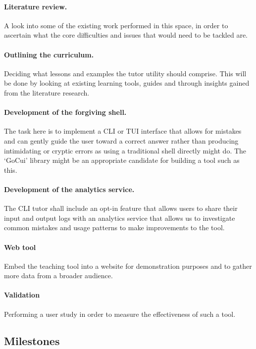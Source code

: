 \documentclass{task_description}
\begin{document}
\paragraph{Literature review.} A look into some of the existing work performed in
this space, in order to ascertain what the core difficulties and issues that
would need to be tackled are. 

\paragraph{Outlining the curriculum.} Deciding what lessons and examples
the tutor utility should comprise. This will be done by looking at existing
learning tools, guides and through insights gained from the literature
research.

\paragraph{Development of the forgiving shell.} The task here is to
implement a CLI or TUI interface that allows for mistakes and can gently guide
the user toward a correct answer rather than producing intimidating or cryptic
errors as using a traditional shell directly might do. The `GoCui' library
might be an appropriate candidate for building a tool such as this.

\paragraph{Development of the analytics service.} The CLI tutor shall include
an opt-in feature that allows users to share their input and output logs with
an analytics service that allows us to investigate common mistakes and usage
patterns to make improvements to the tool.

\paragraph{Web tool} Embed the teaching tool into a website for demonstration
purposes and to gather more data from a broader audience.

\paragraph{Validation} Performing a user study in order to measure the
effectiveness of such a tool.

\subsection*{Milestones}
\end{document}
